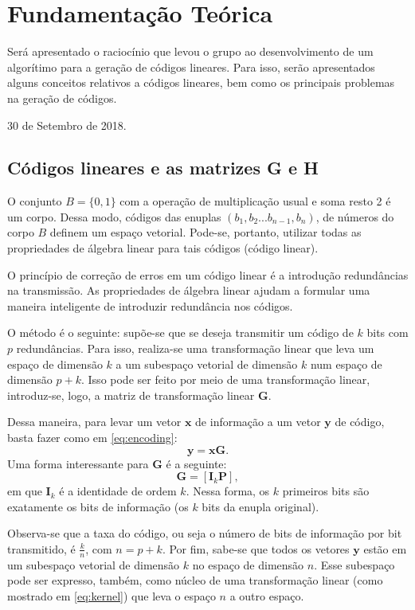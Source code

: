\section{Fundamentação Teórica}
Será apresentado o raciocínio que levou o grupo ao desenvolvimento de um algorítimo para a geração de códigos lineares. Para isso, serão apresentados alguns conceitos relativos a códigos lineares, bem como os principais problemas na geração de códigos.
 
\hfill 30 de Setembro de 2018.

\subsection{Códigos lineares e as matrizes G e H}
O conjunto $\textit{B} = \{0, 1\}$ com a operação de multiplicação usual e soma resto 2 é um corpo. Dessa modo, códigos das enuplas $(b_1, b_2 ...b_{n-1}, b_n)$, de números do corpo $\textit{B}$ definem um espaço vetorial. Pode-se, portanto, utilizar todas as propriedades de álgebra linear para tais códigos (código linear).

O princípio de correção de erros em um código linear é a introdução redundâncias na transmissão. As propriedades de álgebra linear ajudam a formular uma maneira inteligente de introduzir redundância nos códigos.

O método é o seguinte: supõe-se que se deseja transmitir um código de $k$ bits com $p$ redundâncias. Para isso, realiza-se uma transformação linear que leva um espaço de dimensão $k$ a um subespaço vetorial de dimensão $k$ num espaço de dimensão $p+k$. Isso pode ser feito por meio de uma transformação linear, introduz-se, logo, a matriz de transformação linear $\textbf{G}$.

Dessa maneira, para levar um vetor $\textbf{x}$ de informação a um vetor $\textbf{y}$ de código, basta fazer como em \ref{eq:encoding}:
\begin{equation}
    \textbf{y} = \textbf{x}\textbf{G}.
    \label{eq:encoding}
\end{equation}
Uma forma interessante para $\textbf{G}$ é a seguinte:
\begin{equation}
    \textbf{G} = [\textbf{I}_k \textbf{P}],
    \label{eq:G}
\end{equation}
em que $\textbf{I}_k$ é a identidade de ordem $k$. Nessa forma, os $k$ primeiros bits são exatamente os bits de informação (os $\textit{k}$ bits da enupla original).

Observa-se que a taxa do código, ou seja o número de bits de informação por bit transmitido, é $\frac{k}{n}$, com $n = p+k$. Por fim, sabe-se que todos os vetores $\textbf{y}$ estão em um subespaço vetorial de dimensão $k$ no espaço de dimensão $n$. Esse subespaço pode ser expresso, também, como núcleo de uma transformação linear (como mostrado em \ref{eq:kernel}) que leva o espaço $n$ a outro espaço.

